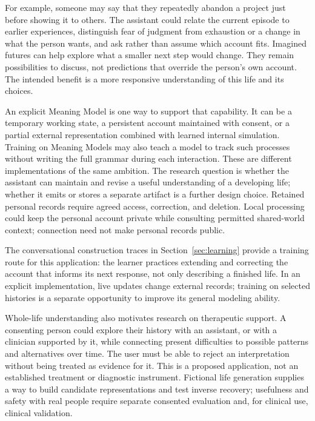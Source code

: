 \documentclass[10pt]{article}
\begin{document}
For example, someone may say that they repeatedly abandon a project just
before showing it to others. The assistant could relate the current episode
to earlier experiences, distinguish fear of judgment from exhaustion or a
change in what the person wants, and ask rather than assume which account
fits. Imagined futures can help explore what a smaller next step would change.
They remain possibilities to discuss, not predictions that override the
person's own account. The intended benefit is a more responsive understanding
of this life and its choices.

An explicit Meaning Model is one way to support that capability. It can be a
temporary working state, a persistent account maintained with consent, or a
partial external representation combined with learned internal simulation.
Training on Meaning Models may also teach a model to track such processes
without writing the full grammar during each interaction. These are different
implementations of the same ambition. The research question is whether the
assistant can maintain and revise a useful understanding of a developing life;
whether it emits or stores a separate artifact is a further design choice.
Retained personal records require agreed access, correction, and deletion.
Local processing could keep the personal account private while consulting
permitted shared-world context; connection need not make personal records public.

The conversational construction traces in Section~\ref{sec:learning} provide
a training route for this application: the learner practices extending and
correcting the account that informs its next response, not only describing a
finished life. In an explicit implementation, live updates change external
records; training on selected histories is a separate opportunity to improve
its general modeling ability.

Whole-life understanding also motivates research on therapeutic support.
A consenting person could explore their history with an assistant, or with a
clinician supported by it, while connecting present difficulties to possible
patterns and alternatives over time. The user must be able to reject an
interpretation without being treated as evidence for it. This is a proposed
application, not an established treatment or diagnostic instrument. Fictional
life generation supplies a way to build candidate representations and test
inverse recovery; usefulness and safety with real people require separate
consented evaluation and, for clinical use, clinical validation.
\end{document}
